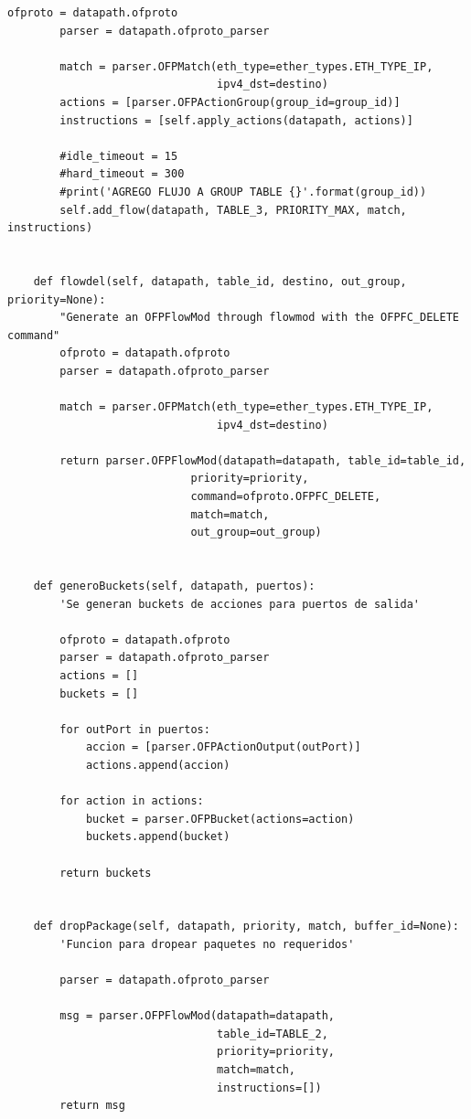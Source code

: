 \documentclass[12pt,a4paper,oneside]{book}
\begin{document}
\begin{lstlisting}[style=codigobase,  label = cod_correrP, caption= controlador.py]
        ofproto = datapath.ofproto
        parser = datapath.ofproto_parser

        match = parser.OFPMatch(eth_type=ether_types.ETH_TYPE_IP,
                                ipv4_dst=destino)
        actions = [parser.OFPActionGroup(group_id=group_id)]
        instructions = [self.apply_actions(datapath, actions)]

        #idle_timeout = 15
        #hard_timeout = 300
        #print('AGREGO FLUJO A GROUP TABLE {}'.format(group_id))
        self.add_flow(datapath, TABLE_3, PRIORITY_MAX, match, instructions)


    def flowdel(self, datapath, table_id, destino, out_group, priority=None):
        "Generate an OFPFlowMod through flowmod with the OFPFC_DELETE command"
        ofproto = datapath.ofproto
        parser = datapath.ofproto_parser

        match = parser.OFPMatch(eth_type=ether_types.ETH_TYPE_IP,
                                ipv4_dst=destino)

        return parser.OFPFlowMod(datapath=datapath, table_id=table_id,
                            priority=priority,
                            command=ofproto.OFPFC_DELETE,
                            match=match,
                            out_group=out_group)


    def generoBuckets(self, datapath, puertos):
        'Se generan buckets de acciones para puertos de salida'

        ofproto = datapath.ofproto
        parser = datapath.ofproto_parser
        actions = []
        buckets = []

        for outPort in puertos:
            accion = [parser.OFPActionOutput(outPort)]
            actions.append(accion)

        for action in actions:
            bucket = parser.OFPBucket(actions=action)
            buckets.append(bucket)

        return buckets


    def dropPackage(self, datapath, priority, match, buffer_id=None):
        'Funcion para dropear paquetes no requeridos'

        parser = datapath.ofproto_parser

        msg = parser.OFPFlowMod(datapath=datapath,
                                table_id=TABLE_2,
                                priority=priority,
                                match=match,
                                instructions=[])
        return msg



\end{lstlisting}
\end{document}
